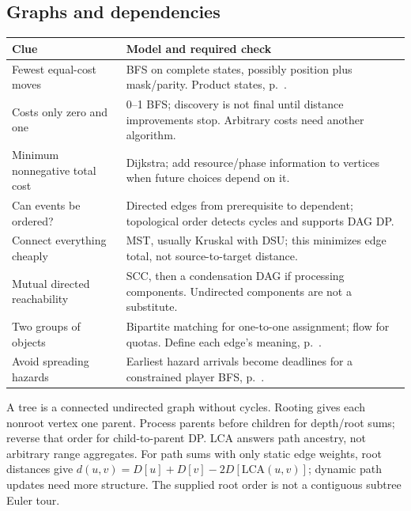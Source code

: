 \subsection{Graphs and dependencies}
\noindent\begin{tabular}{@{}p{}p{}@{}}
\textbf{Clue} & \textbf{Model and required check}\\\hline
Fewest equal-cost moves & BFS on complete states, possibly position plus mask/parity. Product states, p.~\pageref{case:state-bfs}.\\
Costs only zero and one & 0--1 BFS; discovery is not final until distance improvements stop. Arbitrary costs need another algorithm.\\
Minimum nonnegative total cost & Dijkstra; add resource/phase information to vertices when future choices depend on it.\\
Can events be ordered? & Directed edges from prerequisite to dependent; topological order detects cycles and supports DAG DP.\\
Connect everything cheaply & MST, usually Kruskal with DSU; this minimizes edge total, not source-to-target distance.\\
Mutual directed reachability & SCC, then a condensation DAG if processing components. Undirected components are not a substitute.\\
Two groups of objects & Bipartite matching for one-to-one assignment; flow for quotas. Define each edge's meaning, p.~\pageref{case:matching}.\\
Avoid spreading hazards & Earliest hazard arrivals become deadlines for a constrained player BFS, p.~\pageref{case:hazards}.\\
\end{tabular}

A tree is a connected undirected graph without cycles. Rooting gives each
nonroot vertex one parent. Process parents before children for depth/root
sums; reverse that order for child-to-parent DP. LCA answers path ancestry,
not arbitrary range aggregates. For path sums with only static edge weights,
root distances give $d(u,v)=D[u]+D[v]-2D[\mathrm{LCA}(u,v)]$; dynamic path
updates need more structure. The supplied root order is not a contiguous
subtree Euler tour.


